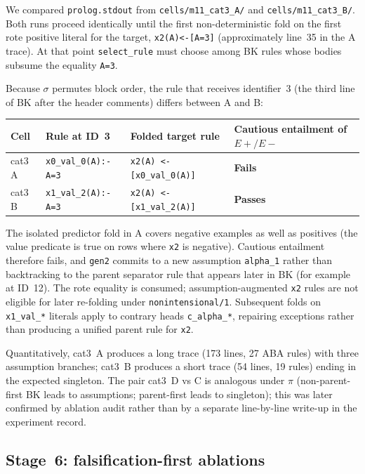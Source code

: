\documentclass[11pt,a4paper]{article}
\begin{document}
We compared \texttt{prolog.stdout} from
\texttt{cells/m11\_cat3\_A/} and \texttt{cells/m11\_cat3\_B/}. Both runs proceed identically
until the first non-deterministic fold on the first rote positive literal for the target,
\texttt{x2(A)<-[A=3]} (approximately line~35 in the A trace). At that point \texttt{select\_rule}
must choose among BK rules whose bodies subsume the equality \texttt{A=3}.

Because $\sigma$ permutes block order, the rule that receives identifier~3 (the third line of
BK after the header comments) differs between A and B:

\begin{center}
\small
\setlength{\tabcolsep}{4pt}
\begin{tabularx}{\linewidth}{@{}lYYY@{}}
\toprule
Cell & Rule at ID~3 & Folded target rule & Cautious entailment of $E+/E-$ \\
\midrule
cat3 A & \texttt{x0\_val\_0(A):-A=3} & \texttt{x2(A) <- [x0\_val\_0(A)]} & \textbf{Fails} \\
cat3 B & \texttt{x1\_val\_2(A):-A=3} & \texttt{x2(A) <- [x1\_val\_2(A)]} & \textbf{Passes} \\
\bottomrule
\end{tabularx}
\end{center}

The isolated predictor fold in A covers negative examples as well as positives (the value
predicate is true on rows where \texttt{x2} is negative). Cautious entailment therefore fails,
and \texttt{gen2} commits to a new assumption \texttt{alpha\_1} rather than backtracking to the
parent separator rule that appears later in BK (for example at ID~12). The rote equality is
consumed; assumption-augmented \texttt{x2} rules are not eligible for later re-folding under
\texttt{nonintensional/1}. Subsequent folds on \texttt{x1\_val\_*} literals apply to contrary
heads \texttt{c\_alpha\_*}, repairing exceptions rather than producing a unified parent rule for
\texttt{x2}.

Quantitatively, cat3~A produces a long trace (173 lines, 27 ABA rules) with three assumption
branches; cat3~B produces a short trace (54 lines, 19 rules) ending in the expected singleton.
The pair cat3~D vs C is analogous under $\pi$ (non-parent-first BK leads to assumptions;
parent-first leads to singleton); this was later confirmed by ablation audit rather than by a
separate line-by-line write-up in the experiment record.

\subsection{Stage~6: falsification-first ablations}
\label{sec:ablations}
\end{document}
